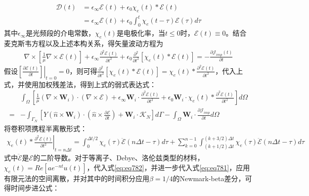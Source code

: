 \documentclass{article}
\numberwithin{equation}{section}
\renewcommand{\vec}[1]{\boldsymbol{#1}}
\begin{document}
\begin{align}
    \label{eq:eq779}
    \vec{\mathcal{D}}(t)&=\epsilon_{\infty}\vec{\mathcal{E}}(t)+\epsilon_0\chi_e(t)\ast \vec{\mathcal{E}}(t) \nonumber \\
                        &=\epsilon_{\infty}\vec{\mathcal{E}}(t)+\epsilon_0\int_0^t\chi_e(t-\tau)\vec{\mathcal{E}}(\tau)d\tau
\end{align}
其中$\epsilon_{\infty}$是光频段的介电常数，$\chi_e(t)$是电极化率，当$t\leq0$时，$\vec{\mathcal{E}}(t)\equiv 0$。结合麦克斯韦方程以及上述本构关系，得矢量波动方程为
\begin{align}
    \label{eq:eq780}
    \nabla\times\left[\frac{1}{\mu}\nabla\times\vec{\mathcal{E}}(t)\right]+\epsilon_{\infty}\frac{\partial^2\vec{\mathcal{E}}(t)}{\partial t^2}+\epsilon_0\frac{\partial^2}{\partial t^2}\left[\chi_e(t)*\vec{\mathcal{E}}(t)\right]=-\frac{\partial \vec{\mathcal{J}}_{imp}(t)}{\partial t}
\end{align}
假设$\left.[\frac{\partial\vec{\mathcal{E}}(t)}{\partial t}]\right|_{t=0}=0$，则可得$\frac{\partial^2}{\partial t^2}\left[\chi_e(t)*\vec{\mathcal{E}}(t)\right]=\chi_e(t)*\frac{\partial^2\vec{\mathcal{E}}(t)}{\partial t^2}$，代入上式，并使用加权残差法，得到上式的弱式表达式：
\begin{align}
    \label{eq:eq781}
     &\int_{\Omega}\left[\frac{1}{\mu}\left(\nabla\times\mathbf{W}_i\right)\cdot\left(\nabla\times\vec{\mathcal{E}}\right)+\epsilon_{\infty}\mathbf{W}_i\cdot\frac{\partial^2\vec{\mathcal{E}}(t)}{\partial t^2}+\epsilon_{0}\mathbf{W}_i\cdot\chi_e(t)*\frac{\partial^2\vec{\mathcal{E}}(t)}{\partial t^2}\right]d\Omega \nonumber \\
    =&-\int_{\Gamma_N}\left[Y(\hat{n}\times\mathbf{W}_i)\cdot\left(\hat{n}\times\frac{\partial \vec{\mathcal{E}}}{\partial t}\right)+\mathbf{W}_i\cdot\vec{\mathcal{K}}_N\right]d\Gamma-\int_{\Omega}\mathbf{W}_i\cdot\frac{\partial \vec{\mathcal{J}}_{imp}}{\partial t}d\Omega
\end{align}
将卷积项携程半离散形式：
\begin{align}
    \label{eq:eq782}
    \left.\chi_e(t)*\frac{\partial^2\vec{\mathcal{E}}(t)}{\partial t^2}\right|_{t=n\Delta t}=\int_0^{\Delta t/2}\chi_e(\tau)\ddot{\vec{\mathcal{E}}}(n\Delta t-\tau)d\tau+\sum_{k=0}^{n-1}\int_{(k+1/2)\Delta t}^{(k+3/2)\Delta t}\chi_e(\tau)\ddot{\vec{\mathcal{E}}}(n\Delta t-\tau)d\tau
\end{align}
式中$\ddot{\vec{\mathcal{E}}}$是$\vec{\mathcal{E}}$的二阶导数。对于等离子、Debye、洛伦兹类型的材料，$\chi_e(t)=Re\left[ae^{-nt}u(t)\right]$，代入式\ref{eq:eq782}，并进一步代入式\ref{eq:eq781}，应用有限元法的空间离散，并对其中的时间积分应用$\beta=1/4$的Newmark-beta差分，可得时间步进公式：
\end{document}
